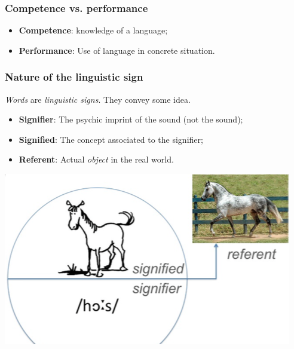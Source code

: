 \subsubsection{Competence vs. performance}

\begin{itemize}
	\item \textbf{Competence}: knowledge of a language;
	\item \textbf{Performance}: Use of language in concrete situation.
\end{itemize}

\subsubsection{Nature of the linguistic sign}

\textit{Words} are \textit{linguistic signs}. They convey some idea.

\noindent
\begin{minipage}{.5\textwidth}
	\begin{itemize}
		\item \textbf{Signifier}: The psychic imprint of the sound (not the sound);
		\item \textbf{Signified}: The concept associated to the signifier;
		\item \textbf{Referent}: Actual \textit{object} in the real world.
	\end{itemize}
\end{minipage}%
\begin{minipage}{.5\textwidth}
	\centering
	\includegraphics[scale=0.4]{images/01_nature.png}
\end{minipage}

\vspace{10px}


